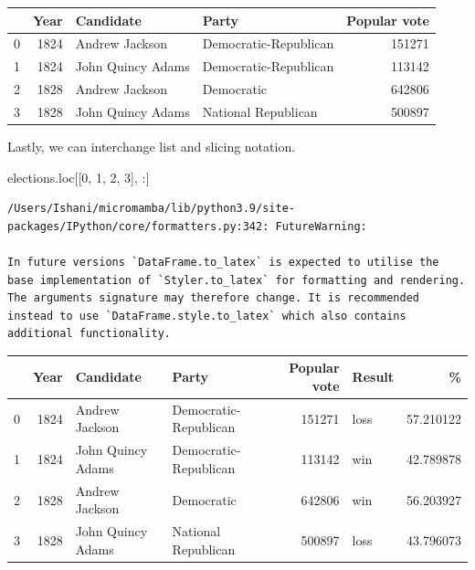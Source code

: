 \documentclass[
  letterpaper,
  DIV=11,
  numbers=noendperiod]{scrreprt}
\newenvironment{Shaded}{\begin{snugshade}}{\end{snugshade}}
\newcommand{\DecValTok}[1]{\textcolor[rgb]{0.68,0.00,0.00}{#1}}
\newcommand{\NormalTok}[1]{\textcolor[rgb]{0.00,0.23,0.31}{#1}}
\begin{document}
\begin{tabular}{lrllr}
\toprule
{} &  Year &          Candidate &                  Party &  Popular vote \\
\midrule
0 &  1824 &     Andrew Jackson &  Democratic-Republican &        151271 \\
1 &  1824 &  John Quincy Adams &  Democratic-Republican &        113142 \\
2 &  1828 &     Andrew Jackson &             Democratic &        642806 \\
3 &  1828 &  John Quincy Adams &    National Republican &        500897 \\
\bottomrule
\end{tabular}

Lastly, we can interchange list and slicing notation.

\begin{Shaded}
\begin{Highlighting}[]
\NormalTok{elections.loc[[}\DecValTok{0}\NormalTok{, }\DecValTok{1}\NormalTok{, }\DecValTok{2}\NormalTok{, }\DecValTok{3}\NormalTok{], :]}
\end{Highlighting}
\end{Shaded}

\begin{verbatim}
/Users/Ishani/micromamba/lib/python3.9/site-packages/IPython/core/formatters.py:342: FutureWarning:

In future versions `DataFrame.to_latex` is expected to utilise the base implementation of `Styler.to_latex` for formatting and rendering. The arguments signature may therefore change. It is recommended instead to use `DataFrame.style.to_latex` which also contains additional functionality.
\end{verbatim}

\begin{tabular}{lrllrlr}
\toprule
{} &  Year &          Candidate &                  Party &  Popular vote & Result &          \% \\
\midrule
0 &  1824 &     Andrew Jackson &  Democratic-Republican &        151271 &   loss &  57.210122 \\
1 &  1824 &  John Quincy Adams &  Democratic-Republican &        113142 &    win &  42.789878 \\
2 &  1828 &     Andrew Jackson &             Democratic &        642806 &    win &  56.203927 \\
3 &  1828 &  John Quincy Adams &    National Republican &        500897 &   loss &  43.796073 \\
\bottomrule
\end{tabular}
\end{document}
